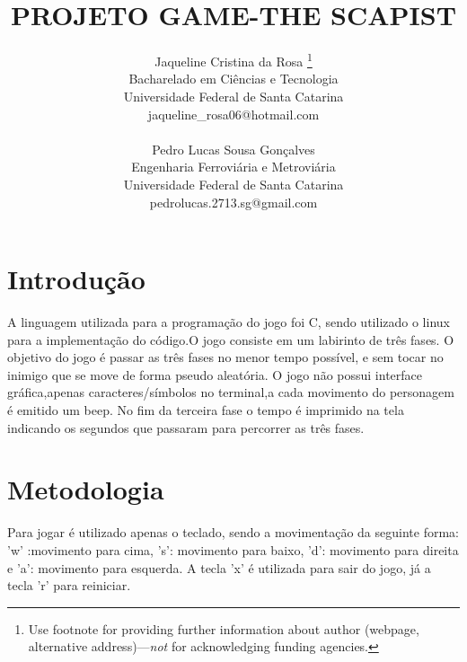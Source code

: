 \documentclass[journal]{IEEEtran}
\title                                                {PROJETO GAME-THE SCAPIST}{}
\author{
  Jaqueline Cristina da Rosa  \thanks{Use footnote for providing further
    information about author (webpage, alternative
    address)---\emph{not} for acknowledging funding agencies.} \\
  Bacharelado em Ciências e Tecnologia \\
  Universidade Federal de Santa Catarina\\
  jaqueline_rosa06@hotmail.com\\
  \texttt{}
   \And
 \\Pedro Lucas Sousa Gonçalves \\
  Engenharia Ferroviária e Metroviária\\
  Universidade Federal de Santa Catarina\\
  pedrolucas.2713.sg@gmail.com \\
  \texttt{}
}
\begin{document}
\maketitle
\IEEEdisplaynontitleabstractindextext
\IEEEpeerreviewmaketitle


\section{Introdução}
A linguagem utilizada para a programação do jogo foi C,  sendo utilizado o linux para a implementação do código.O  jogo consiste em um labirinto de três fases. O objetivo do jogo é passar as três fases no menor tempo possível, e sem tocar no inimigo que se move de forma pseudo aleatória. O jogo não possui interface gráfica,apenas caracteres/símbolos no terminal,a cada movimento do personagem  é emitido um beep. No fim da terceira fase o tempo é imprimido na tela indicando os segundos  que passaram para percorrer as três fases.









\section{Metodologia}
Para jogar é utilizado apenas o teclado, sendo a movimentação da seguinte forma: 'w' :movimento para cima, 's': movimento para baixo, 'd': movimento para direita e 'a': movimento para esquerda. A tecla 'x' é utilizada para sair do jogo, já a tecla 'r' para reiniciar.
\end{document}
